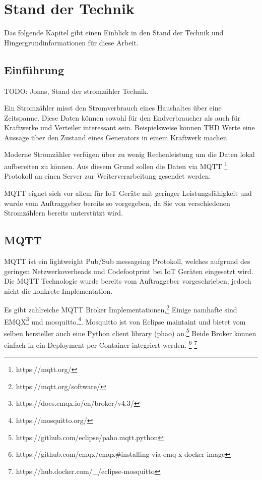\chapter{Stand der Technik}

Das folgende Kapitel gibt einen Einblick in den Stand der Technik und Hingergrundinformationen
für diese Arbeit.

\section{Einführung}

TODO: Jonas, Stand der stromzähler Technik.

Ein Stromzähler \cite{wikipedia:meter} misst den Stromverbrauch eines Haushaltes über eine
Zeitspanne. Diese Daten können sowohl für den Endverbraucher als auch für Kraftwerke
und Verteiler interessant sein. Beispielsweise können \ac{THD} \cite{siemens:disw_2021}
Werte eine Aussage über den Zustand eines Generators in einem Kraftwerk machen. \cite{thd-generators}

Moderne Stromzähler verfügen über zu wenig Rechenleistung um die Daten lokal
aufbereiten zu können. \cite{dc450-technical-data}
Aus diesem Grund sollen die Daten via \ac{MQTT} \footnote{https://mqtt.org/} Protokoll
an einen Server zur Weiterverarbeitung gesendet werden.

\ac{MQTT} eignet sich vor allem für \ac{IoT} Geräte mit geringer Leistungsfähigkeit
und wurde vom Auftraggeber bereits so vorgegeben, da Sie von verschiedenen
Stromzählern bereits unterstützt wird.


\section{MQTT}

\ac{MQTT} ist ein lightweight Pub/Sub messageing Protokoll, welches aufgrund des
geringen Netzwerkoverheads und Codefootprint bei \ac{IoT} Geräten eingesetzt wird.\cite{mqtt}
Die \ac{MQTT} Technologie wurde bereits vom Auftraggeber vorgeschrieben, jedoch
nicht die konkrete Implementation.

Es gibt zahlreiche \ac{MQTT} Broker Implementationen,\footnote{https://mqtt.org/software/}
Einige namhafte sind EMQX\footnote{https://docs.emqx.io/en/broker/v4.3/} und mosquitto.\footnote{https://mosquitto.org/}.
Mosquitto ist von Eclipse maintaint und bietet vom selben hersteller auch eine
Python client library (phao) an.\footnote{https://github.com/eclipse/paho.mqtt.python}
Beide Broker können einfach in ein Deployment per Container integriert werden.
\footnote{https://github.com/emqx/emqx\#installing-via-emq-x-docker-image} \footnote{https://hub.docker.com/\_/eclipse-mosquitto}

